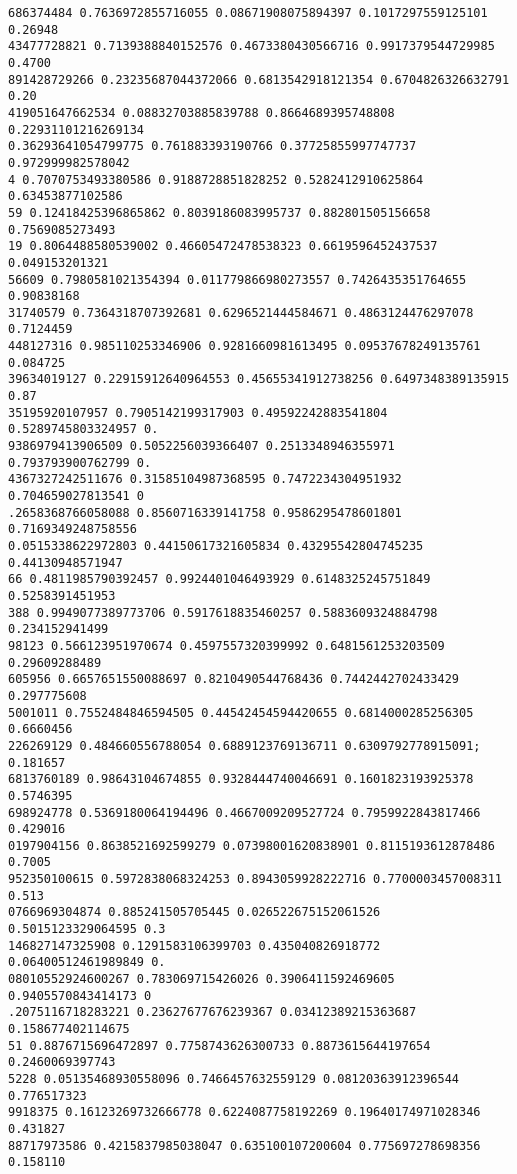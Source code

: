 \documentclass[12pt,a4paper]{article}
\begin{document}
\begin{lstlisting}
686374484 0.7636972855716055 0.08671908075894397 0.1017297559125101 0.26948
43477728821 0.7139388840152576 0.4673380430566716 0.9917379544729985 0.4700
891428729266 0.23235687044372066 0.6813542918121354 0.6704826326632791 0.20
419051647662534 0.08832703885839788 0.8664689395748808 0.22931101216269134 
0.36293641054799775 0.761883393190766 0.37725855997747737 0.972999982578042
4 0.7070753493380586 0.9188728851828252 0.5282412910625864 0.63453877102586
59 0.12418425396865862 0.8039186083995737 0.882801505156658 0.7569085273493
19 0.8064488580539002 0.46605472478538323 0.6619596452437537 0.049153201321
56609 0.7980581021354394 0.011779866980273557 0.7426435351764655 0.90838168
31740579 0.7364318707392681 0.6296521444584671 0.4863124476297078 0.7124459
448127316 0.985110253346906 0.9281660981613495 0.09537678249135761 0.084725
39634019127 0.22915912640964553 0.45655341912738256 0.6497348389135915 0.87
35195920107957 0.7905142199317903 0.49592242883541804 0.5289745803324957 0.
9386979413906509 0.5052256039366407 0.2513348946355971 0.793793900762799 0.
4367327242511676 0.31585104987368595 0.7472234304951932 0.704659027813541 0
.2658368766058088 0.8560716339141758 0.9586295478601801 0.7169349248758556 
0.0515338622972803 0.44150617321605834 0.43295542804745235 0.44130948571947
66 0.4811985790392457 0.9924401046493929 0.6148325245751849 0.5258391451953
388 0.9949077389773706 0.5917618835460257 0.5883609324884798 0.234152941499
98123 0.566123951970674 0.4597557320399992 0.6481561253203509 0.29609288489
605956 0.6657651550088697 0.8210490544768436 0.7442442702433429 0.297775608
5001011 0.7552484846594505 0.44542454594420655 0.6814000285256305 0.6660456
226269129 0.484660556788054 0.6889123769136711 0.6309792778915091; 0.181657
6813760189 0.98643104674855 0.9328444740046691 0.1601823193925378 0.5746395
698924778 0.5369180064194496 0.4667009209527724 0.7959922843817466 0.429016
0197904156 0.8638521692599279 0.07398001620838901 0.8115193612878486 0.7005
952350100615 0.5972838068324253 0.8943059928222716 0.7700003457008311 0.513
0766969304874 0.885241505705445 0.026522675152061526 0.5015123329064595 0.3
146827147325908 0.1291583106399703 0.435040826918772 0.06400512461989849 0.
08010552924600267 0.783069715426026 0.3906411592469605 0.9405570843414173 0
.2075116718283221 0.23627677676239367 0.03412389215363687 0.158677402114675
51 0.8876715696472897 0.7758743626300733 0.8873615644197654 0.2460069397743
5228 0.05135468930558096 0.7466457632559129 0.08120363912396544 0.776517323
9918375 0.16123269732666778 0.6224087758192269 0.19640174971028346 0.431827
88717973586 0.4215837985038047 0.635100107200604 0.775697278698356 0.158110

\end{lstlisting}
\end{document}
